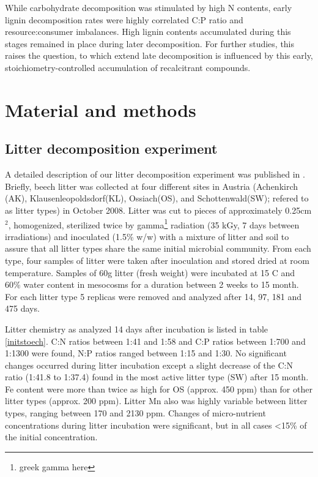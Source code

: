 \documentclass[10pt]{article}
\begin{document}
While carbohydrate decomposition was stimulated by high N contents, early lignin decomposition rates were highly correlated C:P ratio and resource:consumer imbalances. High lignin contents accumulated during this stages remained in place during later decomposition. For further studies, this raises the question, to which extend late decomposition is influenced by this early, stoichiometry-controlled accumulation of recalcitrant compounds.

\section*{Material and methods}
\subsection*{Litter decomposition experiment}
A detailed description of our litter decomposition experiment was published in \cite{Wanek2010}. Briefly, beech litter was collected at four different sites in Austria (Achenkirch (AK), Klausenleopoldsdorf(KL), Ossiach(OS), and Schottenwald(SW); refered to as litter types) in October 2008. Litter was cut to pieces of approximately 0.25cm$^2$, homogenized, sterilized twice by gamma\footnote{greek gamma here} radiation (35 kGy, 7 days between irradiations) and inoculated (1.5\% w/w) with a mixture of litter and soil to assure that all litter types share the same initial microbial community. From each type, four samples of litter were taken after inoculation and stored dried at room temperature. Samples of 60g litter (fresh weight) were incubated at 15 \textdegree C and 60\% water content in mesocosms for a duration between 2 weeks to 15 month. For each litter type 5 replicas were removed and analyzed after 14, 97, 181 and 475 days.

Litter chemistry as analyzed 14 days after incubation is listed in table \ref{initstoech}. C:N ratios between 1:41 and 1:58 and C:P ratios between 1:700 and 1:1300 were found, N:P ratios ranged between 1:15 and 1:30. No significant changes occurred during litter incubation except a slight decrease of the C:N ratio (1:41.8 to 1:37.4) found in the most active litter type (SW) after 15 month. Fe content were more than twice as high for OS (approx. 450 ppm) than for other litter types (approx. 200 ppm). Litter Mn also was highly variable between litter types, ranging between 170 and 2130 ppm. Changes of micro-nutrient concentrations during litter incubation were significant, but in all cases \textless 15\% of the initial concentration.
\end{document}
